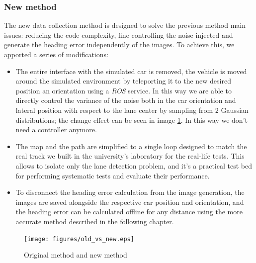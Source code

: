 \documentclass[a4paper,12pt,sort&compress]{article}
\begin{document}
\subsubsection*{New method}
The new data collection method is designed to solve the previous method main issues: reducing the
code complexity, fine controlling the noise injected and generate the heading error independently of
the images. To achieve this, we apported a series of modifications:
\begin{itemize}
    \item The entire interface with the simulated car is removed, the vehicle is moved around the
    simulated environment by teleporting it to the new desired position an orientation using a
    \textit{ROS} service. In this way we are able to directly control the variance of the noise both
    in the car orientation and lateral position with respect to the lane center by sampling from 2
    Gaussian distributions; the change effect can be seen in image \ref*{fig:original_vs_old}. In
    this way we don't  need a controller anymore.
    \item The map and the path are simplified to a single loop designed to match the real track we
    built in the university's laboratory for the real-life tests. This allows to isolate only the
    lane detection problem, and it's a practical test bed for performing systematic tests and
    evaluate their performance. 
    \item To disconnect the heading error calculation from the image generation, the images are
    saved alongside the respective car position and orientation, and the heading error can be
    calculated offline for any distance using the more accurate method described in the following
    chapter.   
\end{itemize}


\begin{figure}
    \centering
    \texttt{[image: figures/old\_vs\_new.eps]}
    \caption{Original method and new method}
    \label{fig:original_vs_old}
\end{figure}

\end{document}
